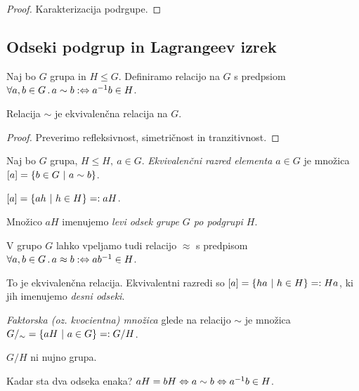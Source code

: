 \begin{proof}
    Karakterizacija podrgupe.
\end{proof}

\subsection{Odseki podgrup in Lagrangeev izrek}
Naj bo $G$ grupa in $H \leq G$. Definiramo relacijo na $G$ s predpsiom $\forall a, b \in G \,.\, a \sim b :\Leftrightarrow a^{-1}b \in H$.

\begin{trditev}
    Relacija $\sim$ je ekvivalenčna relacija na $G$.
\end{trditev}

\begin{proof}
    Preverimo refleksivnost, simetričnost in tranzitivnost.
\end{proof}

\begin{definicija}
    Naj bo $G$ grupa, $H \leq H, \ a \in G$. \emph{Ekvivalenčni razred elementa $a \in G$} je množica $[a] = \left\{b \in G \ | \ a \sim b\right\}$.
\end{definicija}

\begin{opomba}
    $[a] = \left\{ah \ | \ h \in H\right\} =: aH$.
\end{opomba}

\begin{definicija}
    Množico $aH$ imenujemo \emph{levi odsek grupe $G$ po podgrupi $H$}.
\end{definicija}

\begin{opomba}
    V grupo $G$ lahko vpeljamo tudi relacijo $\approx$ s predpisom $\forall a, b \in G \,.\, a \approx b :\Leftrightarrow ab^{-1} \in H$.

    To je ekvivalenčna relacija. Ekvivalentni razredi so $[a] = \left\{ha \ | \ h \in H\right\} =: Ha$, ki jih imenujemo \emph{desni odseki}.
\end{opomba}

\begin{definicija}
    \emph{Faktorska (oz. kvocientna) množica} glede na relacijo $\sim$ je množica $G/_\sim = \left\{aH \ | \ a \in G\right\} =: G/H$.
\end{definicija}

\begin{opomba}
    $G/H$ ni nujno grupa.
\end{opomba}

\begin{opomba}
    Kadar sta dva odseka enaka? $aH = bH \Leftrightarrow a \sim b \Leftrightarrow a^{-1}b \in H$.
\end{opomba}

